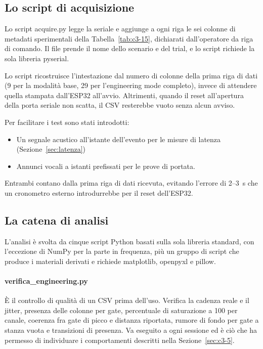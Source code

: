 \subsection{Lo script di acquisizione}
\label{sec:c3-4-4}

Lo script acquire.py legge la seriale e aggiunge a ogni riga le sei colonne di metadati sperimentali della Tabella~\ref{tab:c3-15}, dichiarati dall'operatore da riga di comando. Il file prende il nome dello scenario e del trial, e lo script richiede la sola libreria pyserial.

Lo script ricostruisce l'intestazione dal numero di colonne della prima riga di dati (9 per la modalità base, 29 per l'engineering mode completo), invece di attendere quella stampata dall'ESP32 all'avvio. Altrimenti, quando il reset all'apertura della porta seriale non scatta, il CSV resterebbe vuoto senza alcun avviso.

Per facilitare i test sono stati introdotti:

\begin{itemize}
  \item Un segnale acustico all'istante dell'evento per le misure di latenza (Sezione~\ref{sec:latenza})
  \item Annunci vocali a istanti prefissati per le prove di portata.
\end{itemize}

Entrambi contano dalla prima riga di dati ricevuta, evitando l'errore di 2--3~s che un cronometro esterno introdurrebbe per il reset dell'ESP32.

\subsection{La catena di analisi}
\label{sec:c3-4-5}

L'analisi è svolta da cinque script Python basati sulla sola libreria standard, con l'eccezione di NumPy per la parte in frequenza, più un gruppo di script che produce i materiali derivati e richiede matplotlib, openpyxl e pillow.

\paragraph{verifica\_engineering.py}

È il controllo di qualità di un CSV prima dell'uso. Verifica la cadenza reale e il jitter, presenza delle colonne per gate, percentuale di saturazione a 100 per canale, coerenza fra gate di picco e distanza riportata, rumore di fondo per gate a stanza vuota e transizioni di presenza. Va eseguito a ogni sessione ed è ciò che ha permesso di individuare i comportamenti descritti nella Sezione~\ref{sec:c3-5}.

